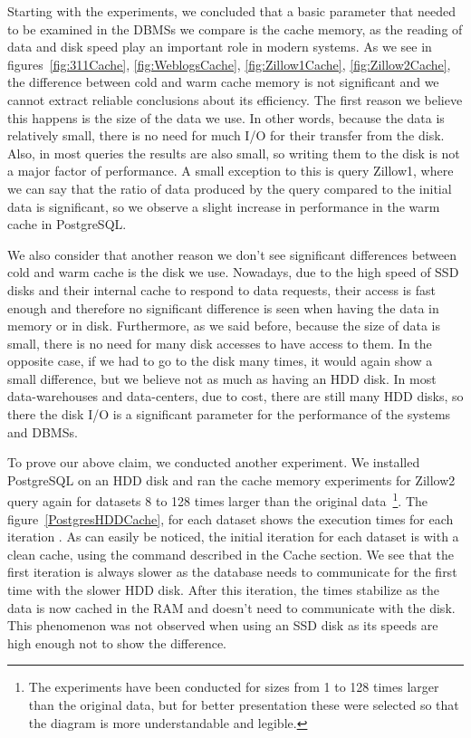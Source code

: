 Starting with the experiments, we concluded that a basic parameter that needed to be examined 
in the DBMSs we compare is the cache memory, as the reading of data and disk speed play an 
important role in modern systems. As we see in figures~\ref{fig:311Cache}, \ref{fig:WeblogsCache},
\ref{fig:Zillow1Cache}, \ref{fig:Zillow2Cache}, the difference between cold and warm 
cache memory is not significant and we cannot extract reliable conclusions about its efficiency. 
The first reason we believe this happens is the size of the data we use. In other words, 
because the data is relatively small, there is no need for much I/O for their transfer from 
the disk. Also, in most queries the results are also small, so writing them to the disk is 
not a major factor of performance. A small exception to this is query Zillow1, where we 
can say that the ratio of data produced by the query compared to the initial data is 
significant, so we observe a slight increase in performance in the warm cache in PostgreSQL.

We also consider that another reason we don't see significant differences between cold and 
warm cache is the disk we use. Nowadays, due to the high speed of SSD disks and their internal 
cache to respond to data requests, their access is fast enough and therefore no significant 
difference is seen when having the data in memory or in disk. Furthermore, as we said before, 
because the size of data is small, there is no need for many disk accesses to have access to 
them. In the opposite case, if we had to go to the disk many times, it would again show a 
small difference, but we believe not as much as having an HDD disk. In most data-warehouses 
and data-centers, due to cost, there are still many HDD disks, so there the disk I/O is a 
significant parameter for the performance of the systems and DBMSs.

To prove our above claim, we conducted another experiment. We installed PostgreSQL on an HDD 
disk and ran the cache memory experiments for Zillow2 query again for datasets 8 to 128 times 
larger than the original data~\footnote{The experiments have been conducted for sizes from 1 
to 128 times larger than the original data, but for better presentation these were selected so 
that the diagram is more understandable and legible.}. The figure~\ref{PostgresHDDCache}, for 
each dataset shows the execution times for each iteration . As can easily be noticed, the 
initial iteration for each dataset is with a clean cache, using the command described in 
the Cache section. We see that the first iteration is always slower as the database needs to 
communicate for the first time with the slower HDD disk. After this iteration, the times 
stabilize as the data is now cached in the RAM and doesn't need to communicate with the disk. 
This phenomenon was not observed when using an SSD disk as its speeds are high enough not to 
show the difference.


